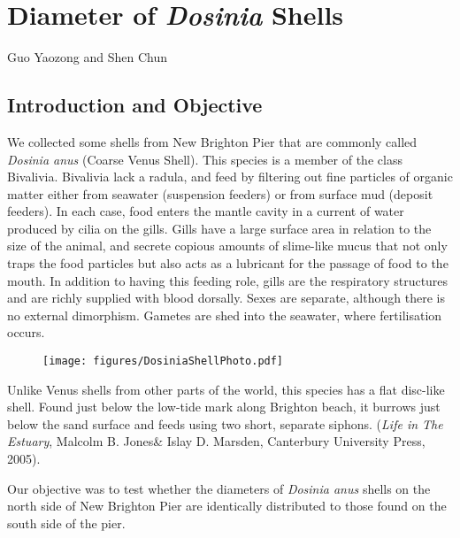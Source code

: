 \section{Diameter of \textit{Dosinia} Shells}
\begin{center}
Guo Yaozong and Shen Chun
\end{center}

\subsection{Introduction and Objective}

We collected some shells from New Brighton Pier that are commonly called \textit{Dosinia anus} (Coarse Venus Shell). This species is a member of the class Bivalivia. Bivalivia lack a radula, and feed by filtering out fine particles of organic matter either from seawater (suspension feeders) or from surface mud (deposit feeders). In each case, food enters the mantle cavity in a current of water produced by cilia on the gills. Gills have a large surface area in relation to the size of the animal, and secrete copious amounts of slime-like mucus that not only traps the food particles but also acts as a lubricant for the passage of food to the mouth. In addition to having this feeding role, gills are the respiratory structures and are richly supplied with blood dorsally. Sexes are separate, although there is no external dimorphism. Gametes are shed into the seawater, where fertilisation occurs.

\begin{figure}[ht]
\begin{center}
\texttt{[image: figures/DosiniaShellPhoto.pdf]}
\end{center}
\end{figure}

Unlike Venus shells from other parts of the world, this species has a flat disc-like shell. Found just below the low-tide mark along Brighton beach, it burrows just below the sand surface and feeds using two short, separate siphons. ({\it Life in The Estuary}, Malcolm B. Jones\& Islay D. Marsden, Canterbury University Press, 2005).


Our objective was to test whether the diameters of \textit{Dosinia anus} shells on the north side of New Brighton Pier are identically distributed to those found on the south side of the pier.


